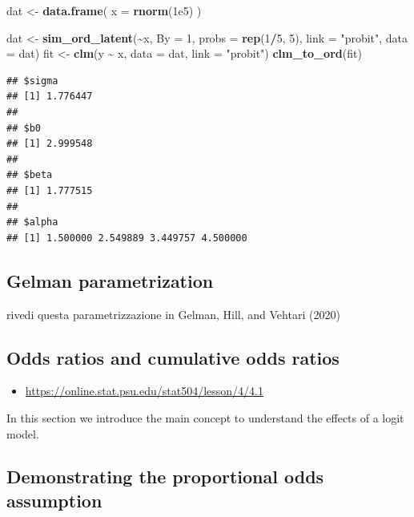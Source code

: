 \documentclass[
  man,floatsintext]{apa6}
\newenvironment{Shaded}{\begin{snugshade}}{\end{snugshade}}
\newcommand{\AttributeTok}[1]{\textcolor[rgb]{0.13,0.29,0.53}{#1}}
\newcommand{\DecValTok}[1]{\textcolor[rgb]{0.00,0.00,0.81}{#1}}
\newcommand{\FloatTok}[1]{\textcolor[rgb]{0.00,0.00,0.81}{#1}}
\newcommand{\FunctionTok}[1]{\textcolor[rgb]{0.13,0.29,0.53}{\textbf{#1}}}
\newcommand{\NormalTok}[1]{#1}
\newcommand{\OtherTok}[1]{\textcolor[rgb]{0.56,0.35,0.01}{#1}}
\newcommand{\SpecialCharTok}[1]{\textcolor[rgb]{0.81,0.36,0.00}{\textbf{#1}}}
\newcommand{\StringTok}[1]{\textcolor[rgb]{0.31,0.60,0.02}{#1}}
\providecommand{\tightlist}{%
  \setlength{\itemsep}{0pt}\setlength{\parskip}{0pt}}
\begin{document}
\begin{Shaded}
\begin{Highlighting}[]
\NormalTok{dat }\OtherTok{\textless{}{-}} \FunctionTok{data.frame}\NormalTok{(}
  \AttributeTok{x =} \FunctionTok{rnorm}\NormalTok{(}\FloatTok{1e5}\NormalTok{)}
\NormalTok{)}

\NormalTok{dat }\OtherTok{\textless{}{-}} \FunctionTok{sim\_ord\_latent}\NormalTok{(}\SpecialCharTok{\textasciitilde{}}\NormalTok{x, }\AttributeTok{By =} \DecValTok{1}\NormalTok{, }\AttributeTok{probs =} \FunctionTok{rep}\NormalTok{(}\DecValTok{1}\SpecialCharTok{/}\DecValTok{5}\NormalTok{, }\DecValTok{5}\NormalTok{), }\AttributeTok{link =} \StringTok{"probit"}\NormalTok{, }\AttributeTok{data =}\NormalTok{ dat)}
\NormalTok{fit }\OtherTok{\textless{}{-}} \FunctionTok{clm}\NormalTok{(y }\SpecialCharTok{\textasciitilde{}}\NormalTok{ x, }\AttributeTok{data =}\NormalTok{ dat, }\AttributeTok{link =} \StringTok{"probit"}\NormalTok{)}
\FunctionTok{clm\_to\_ord}\NormalTok{(fit)}
\end{Highlighting}
\end{Shaded}

\begin{verbatim}
## $sigma
## [1] 1.776447
## 
## $b0
## [1] 2.999548
## 
## $beta
## [1] 1.777515
## 
## $alpha
## [1] 1.500000 2.549889 3.449757 4.500000
\end{verbatim}

\subsection{Gelman parametrization}\label{gelman-parametrization}

rivedi questa parametrizzazione in Gelman, Hill, and Vehtari (2020)

\subsection{Odds ratios and cumulative odds ratios}\label{odds-ratios-and-cumulative-odds-ratios}

\begin{itemize}
\tightlist
\item
  \url{https://online.stat.psu.edu/stat504/lesson/4/4.1}
\end{itemize}

In this section we introduce the main concept to understand the effects of a logit model.

\subsection{Demonstrating the proportional odds assumption}\label{demonstrating-the-proportional-odds-assumption}
\end{document}
